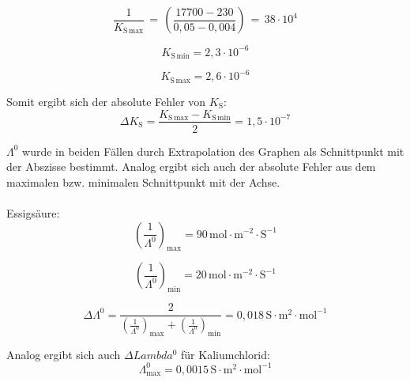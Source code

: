 \documentclass[12pt,a4paper,titlepage,headinclude,bibtotoc]{scrartcl}
\begin{document}
\begin{equation}
\frac{1}{K_{\mathrm{S}\,\mathrm{max}}}\,=\,\left(\frac{17700-230}{0,05-0,004}\right)\,=\, 38 \cdot 10^4
\end{equation}


\begin{equation}
K_{\mathrm{S}\,\mathrm{min}} = 2,3 \cdot 10^{-6}
\end{equation}

\begin{equation}
K_{\mathrm{S}\,\mathrm{max}} = 2,6 \cdot 10^{-6}
\end{equation}


Somit ergibt sich der absolute Fehler von $K_{\mathrm{S}}$:\\

\begin{equation}
\Delta K_{\mathrm{S}} = \frac{K_{\mathrm{S}\,\mathrm{max}} - K_{\mathrm{S}\,\mathrm{min}}}{2} = 1,5 \cdot 10^{-7}
\end{equation}


$\Lambda^0$ wurde in beiden Fällen durch Extrapolation des Graphen als Schnittpunkt mit der Abszisse bestimmt. Analog ergibt sich auch der absolute Fehler aus dem maximalen bzw. minimalen Schnittpunkt mit der Achse. \\
\\
Essigsäure:\\

\begin{equation}
\left(\frac{1}{\Lambda^0}\right)_\mathrm{max} = 90\, \mathrm{mol \cdot m^{-2} \cdot S^{-1}}
\end{equation}

\begin{equation}
\left(\frac{1}{\Lambda^0}\right)_\mathrm{min} = 20\, \mathrm{mol \cdot m^{-2} \cdot S^{-1}}
\end{equation}

\begin{equation}
\Delta \Lambda^0 = \frac{2}{(\frac{1}{\Lambda^0})_\mathrm{max} + (\frac{1}{\Lambda^0})_\mathrm{min}} = 0,018\, \mathrm{S \cdot m^2 \cdot mol^{-1}}
\end{equation}

Analog ergibt sich auch $\Delta Lambda^0$ für Kaliumchlorid:\\

\begin{equation}
\Lambda^0_\mathrm{max} = 0,0015\, \mathrm{S \cdot m^{2} \cdot mol^{-1}} 
\end{equation}
\end{document}
